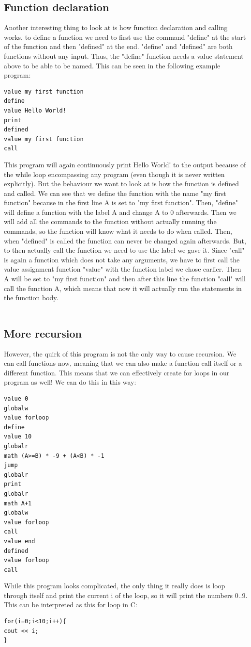 \documentclass{article}
\begin{document}
\subsection{Function declaration}
Another interesting thing to look at is how function declaration and calling works, to define a function we need to first use the command "define" at the start of the function and then "defined" at the end. "define" and "defined" are both functions without any input. Thus, the "define" function needs a value statement above to be able to be named. This can be seen in the following example program:
\begin{verbatim}
value my first function
define
value Hello World!
print
defined
value my first function
call
\end{verbatim}
This program will again continuously print Hello World! to the output because of the while loop encompassing any program (even though it is never written explicitly). But the behaviour we want to look at is how the function is defined and called. We can see that we define the function with the name "my first function" because in the first line A is set to "my first function". Then, "define" will define a function with the label A and change A to 0 afterwards. Then we will add all the commands to the function without actually running the commands, so the function will know what it needs to do when called. Then, when "defined" is called the function can never be changed again afterwards. But, to then actually call the function we need to use the label we gave it. Since "call" is again a function which does not take any arguments, we have to first call the value assignment function "value" with the function label we chose earlier. Then A will be set to "my first function" and then after this line the function "call" will call the function A, which means that now it will actually run the statements in the function body.\\\\
\subsection{More recursion}
However, the quirk of this program is not the only way to cause recursion. We can call functions now, meaning that we can also make a function call itself or a different function. This means that we can effectively create for loops in our program as well! We can do this in this way:
\begin{verbatim}
value 0
globalw
value forloop
define
value 10
globalr
math (A>=B) * -9 + (A<B) * -1
jump
globalr
print
globalr
math A+1
globalw
value forloop
call
value end
defined
value forloop
call
\end{verbatim}
While this program looks complicated, the only thing it really does is loop through itself and print the current i of the loop, so it will print the numbers 0..9. This can be interpreted as this for loop in C:
\begin{verbatim}
for(i=0;i<10;i++){
cout << i;
}
\end{verbatim}
\end{document}
